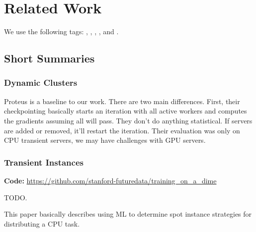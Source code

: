 \chapter{Related Work}
\label{ch:related work}

We use the following tags: \tagdynamic{}, \tagtransient{},
\tagmodelparallelism{}, \tagdataparallelism{}, and \tagoptimizer{}.

\section{Short Summaries}

\subsection{Dynamic Clusters}


\noindent \tagdynamic{} \tagdataparallelism{}

Proteus is a baseline to our work.
There are two main differences.
First, their checkpointing basically starts an iteration with all active workers
and computes the gradients assuming all will pass.
They don't do anything statistical.
If servers are added or removed, it'll restart the iteration.
Their evaluation was only on CPU transient servers, we may have challenges with
GPU servers.


\noindent \tagdynamic{}

\subsection{Transient Instances}

\tagdynamic{} \tagdataparallelism{}

\noindent \textbf{Code:} \url{https://github.com/stanford-futuredata/training_on_a_dime}

TODO.


\noindent \tagdynamic{} \tagdataparallelism{}


This paper basically describes using ML to determine spot instance strategies
for distributing a CPU task.

